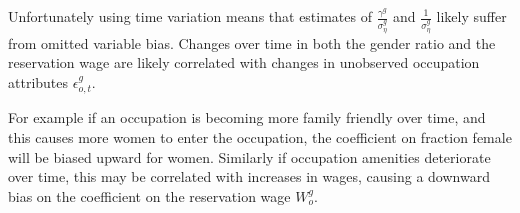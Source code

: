 \documentclass[12pt]{article}
\begin{document}

Unfortunately using time variation means that estimates of $\frac{\gamma^g}{\sigma^g_{\eta}}$ and $\frac{1}{\sigma^g_{\eta}}$ likely suffer from omitted variable bias. Changes over time in both the gender ratio and the reservation wage are likely correlated with changes in unobserved occupation attributes $\epsilon^g_{o,t}$.

For example if an occupation is becoming more family friendly over time, and this causes more women to enter the occupation, the coefficient on fraction female will be biased upward for women. Similarly if occupation amenities deteriorate over time, this may be correlated with increases in wages, causing a downward bias on the coefficient on the reservation wage $W^g_o$.



 
%

 



\end{document}
